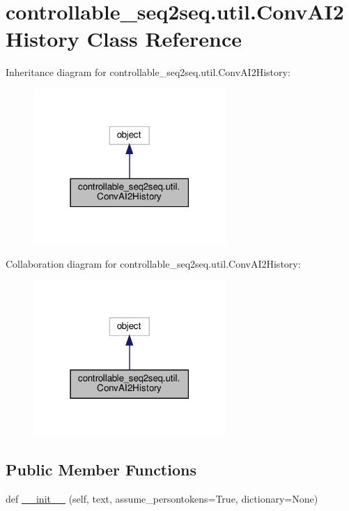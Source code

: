 \hypertarget{classcontrollable__seq2seq_1_1util_1_1ConvAI2History}{}\section{controllable\+\_\+seq2seq.\+util.\+Conv\+A\+I2\+History Class Reference}
\label{classcontrollable__seq2seq_1_1util_1_1ConvAI2History}


Inheritance diagram for controllable\+\_\+seq2seq.\+util.\+Conv\+A\+I2\+History\+:
\nopagebreak
\begin{figure}[H]
\begin{center}
\leavevmode
\includegraphics[width=207pt]{classcontrollable__seq2seq_1_1util_1_1ConvAI2History__inherit__graph}
\end{center}
\end{figure}


Collaboration diagram for controllable\+\_\+seq2seq.\+util.\+Conv\+A\+I2\+History\+:
\nopagebreak
\begin{figure}[H]
\begin{center}
\leavevmode
\includegraphics[width=207pt]{classcontrollable__seq2seq_1_1util_1_1ConvAI2History__coll__graph}
\end{center}
\end{figure}
\subsection*{Public Member Functions}
\begin{DoxyCompactItemize}
\item 
def \hyperlink{classcontrollable__seq2seq_1_1util_1_1ConvAI2History_af36e292c392c06ca0d61c29450f09dc0}{\+\_\+\+\_\+init\+\_\+\+\_\+} (self, text, assume\+\_\+persontokens=True, dictionary=None)
\end{DoxyCompactItemize}
